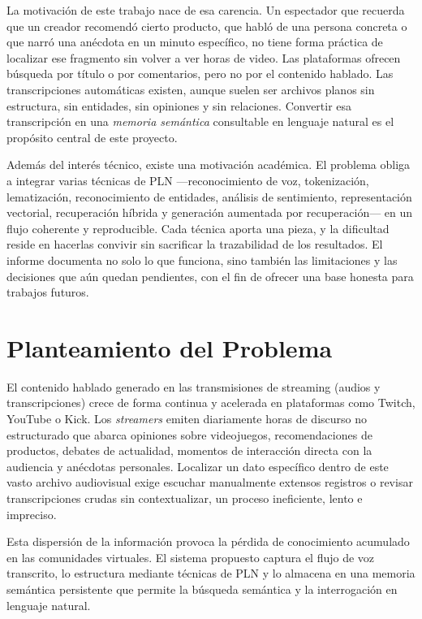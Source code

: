 \documentclass[12pt,a4paper]{article}
\begin{document}
La motivación de este trabajo nace de esa carencia. Un espectador que recuerda que un creador recomendó cierto producto, que habló de una persona concreta o que narró una anécdota en un minuto específico, no tiene forma práctica de localizar ese fragmento sin volver a ver horas de video. Las plataformas ofrecen búsqueda por título o por comentarios, pero no por el contenido hablado. Las transcripciones automáticas existen, aunque suelen ser archivos planos sin estructura, sin entidades, sin opiniones y sin relaciones. Convertir esa transcripción en una \emph{memoria semántica} consultable en lenguaje natural es el propósito central de este proyecto.

Además del interés técnico, existe una motivación académica. El problema obliga a integrar varias técnicas de PLN —reconocimiento de voz, tokenización, lematización, reconocimiento de entidades, análisis de sentimiento, representación vectorial, recuperación híbrida y generación aumentada por recuperación— en un flujo coherente y reproducible. Cada técnica aporta una pieza, y la dificultad reside en hacerlas convivir sin sacrificar la trazabilidad de los resultados. El informe documenta no solo lo que funciona, sino también las limitaciones y las decisiones que aún quedan pendientes, con el fin de ofrecer una base honesta para trabajos futuros.

\section{Planteamiento del Problema}
\label{sec:problema}

El contenido hablado generado en las transmisiones de streaming (audios y transcripciones) crece de forma continua y acelerada en plataformas como Twitch, YouTube o Kick. Los \emph{streamers} emiten diariamente horas de discurso no estructurado que abarca opiniones sobre videojuegos, recomendaciones de productos, debates de actualidad, momentos de interacción directa con la audiencia y anécdotas personales. Localizar un dato específico dentro de este vasto archivo audiovisual exige escuchar manualmente extensos registros o revisar transcripciones crudas sin contextualizar, un proceso ineficiente, lento e impreciso.

Esta dispersión de la información provoca la pérdida de conocimiento acumulado en las comunidades virtuales. El sistema propuesto captura el flujo de voz transcrito, lo estructura mediante técnicas de PLN y lo almacena en una memoria semántica persistente que permite la búsqueda semántica y la interrogación en lenguaje natural.
\end{document}
